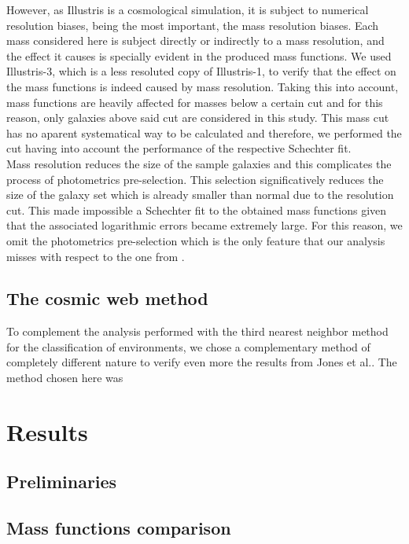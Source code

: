 \documentclass[a4paper,fleqn,usenatbib]{mnras}
\begin{document}
However, as Illustris is a cosmological simulation, it is subject to numerical resolution biases, being the most important, the mass resolution biases. Each mass considered here is subject directly or indirectly to a mass resolution, and the effect it causes is specially evident in the produced mass functions. We used Illustris-3, which is a less resoluted copy of Illustris-1, to verify that the effect on the mass functions is indeed caused by mass resolution. Taking this into account, mass functions are heavily affected for masses below a certain cut and for this reason, only galaxies above said cut are considered in this study. This mass cut has no aparent systematical way to be calculated and therefore, we performed the cut having into account the performance of the respective Schechter fit.\\

Mass resolution reduces the size of the sample galaxies and this complicates the process of photometrics pre-selection. This selection significatively reduces the size of the galaxy set which is already smaller than normal due to the resolution cut. This made impossible a Schechter fit to the obtained mass functions given that the associated logarithmic errors became extremely large. For this reason, we omit the photometrics pre-selection which is the only feature that our analysis misses with respect to the one from \cite{jones1}.\\

\subsection{The cosmic web method}
To complement the analysis performed with the third nearest neighbor method for the classification of environments, we chose a complementary method of completely different nature to verify even more the results from Jones et al.. The method chosen here was

\section{Results}
\subsection{Preliminaries}

\subsection{Mass functions comparison}
\end{document}
